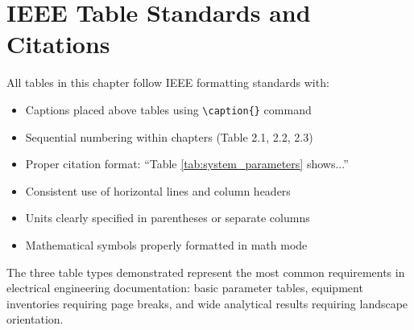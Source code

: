 \section{IEEE Table Standards and Citations}
\label{sec:ieee_standards}

All tables in this chapter follow IEEE formatting standards with:

\begin{itemize}
	\item Captions placed above tables using \texttt{\textbackslash caption\{\}} command
	\item Sequential numbering within chapters (Table 2.1, 2.2, 2.3)
	\item Proper citation format: ``Table \ref{tab:system_parameters} shows...''
	\item Consistent use of horizontal lines and column headers
	\item Units clearly specified in parentheses or separate columns
	\item Mathematical symbols properly formatted in math mode
\end{itemize}

The three table types demonstrated represent the most common requirements in electrical engineering documentation: basic parameter tables, equipment inventories requiring page breaks, and wide analytical results requiring landscape orientation.